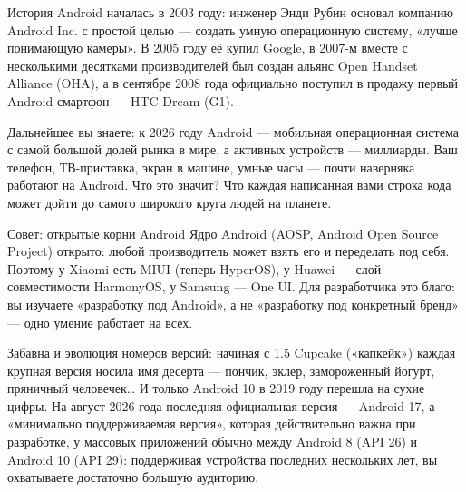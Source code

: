 


История Android началась в 2003 году: инженер Энди Рубин основал компанию Android Inc. с простой целью — создать умную операционную систему, «лучше понимающую камеры». В 2005 году её купил Google, в 2007-м вместе с несколькими десятками производителей был создан альянс Open Handset Alliance (OHA), а в сентябре 2008 года официально поступил в продажу первый Android-смартфон — HTC Dream (G1).

Дальнейшее вы знаете: к 2026 году Android — мобильная операционная система с самой большой долей рынка в мире, а активных устройств — миллиарды. Ваш телефон, ТВ-приставка, экран в машине, умные часы — почти наверняка работают на Android. Что это значит? Что каждая написанная вами строка кода может дойти до самого широкого круга людей на планете.

\begin{tcbinfo}{Совет: открытые корни Android}
Ядро Android (AOSP, Android Open Source Project) открыто: любой производитель может взять его и переделать под себя. Поэтому у Xiaomi есть MIUI (теперь HyperOS), у Huawei — слой совместимости HarmonyOS, у Samsung — One UI. Для разработчика это благо: вы изучаете «разработку под Android», а не «разработку под конкретный бренд» — одно умение работает на всех.

\end{tcbinfo}

Забавна и эволюция номеров версий: начиная с 1.5 Cupcake («капкейк») каждая крупная версия носила имя десерта — пончик, эклер, замороженный йогурт, пряничный человечек… И только Android 10 в 2019 году перешла на сухие цифры. На август 2026 года последняя официальная версия — Android 17, а «минимально поддерживаемая версия», которая действительно важна при разработке, у массовых приложений обычно между Android 8 (API 26) и Android 10 (API 29): поддерживая устройства последних нескольких лет, вы охватываете достаточно большую аудиторию.

